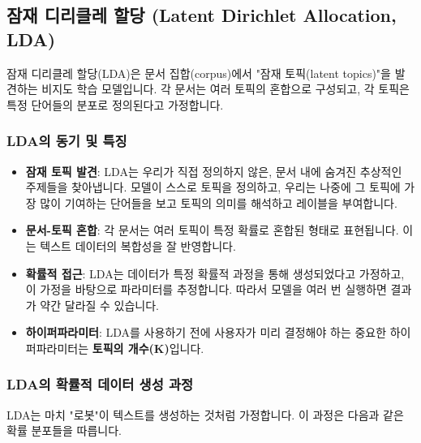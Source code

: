 \documentclass[11pt,a4paper]{article}
\theoremstyle{definition}
\begin{document}
\newpage
\subsection*{잠재 디리클레 할당 (Latent Dirichlet Allocation, LDA)}
\begin{infobox} %
잠재 디리클레 할당(LDA)은 문서 집합(corpus)에서 "잠재 토픽(latent topics)"을 발견하는 비지도 학습 모델입니다.
각 문서는 여러 토픽의 혼합으로 구성되고, 각 토픽은 특정 단어들의 분포로 정의된다고 가정합니다.
\end{infobox}

\subsubsection*{LDA의 동기 및 특징}
\begin{itemize}
    \item \textbf{잠재 토픽 발견}: LDA는 우리가 직접 정의하지 않은, 문서 내에 숨겨진 추상적인 주제들을 찾아냅니다. 모델이 스스로 토픽을 정의하고, 우리는 나중에 그 토픽에 가장 많이 기여하는 단어들을 보고 토픽의 의미를 해석하고 레이블을 부여합니다.
    \item \textbf{문서-토픽 혼합}: 각 문서는 여러 토픽이 특정 확률로 혼합된 형태로 표현됩니다. 이는 텍스트 데이터의 복합성을 잘 반영합니다.
    \item \textbf{확률적 접근}: LDA는 데이터가 특정 확률적 과정을 통해 생성되었다고 가정하고, 이 가정을 바탕으로 파라미터를 추정합니다. 따라서 모델을 여러 번 실행하면 결과가 약간 달라질 수 있습니다.
    \item \textbf{하이퍼파라미터}: LDA를 사용하기 전에 사용자가 미리 결정해야 하는 중요한 하이퍼파라미터는 \textbf{토픽의 개수(K)}입니다.
\end{itemize}

\subsubsection*{LDA의 확률적 데이터 생성 과정}
LDA는 마치 "로봇"이 텍스트를 생성하는 것처럼 가정합니다. 이 과정은 다음과 같은 확률 분포들을 따릅니다.
\end{document}
